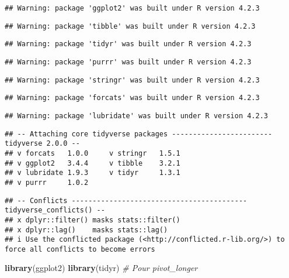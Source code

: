 \documentclass[
]{article}
\newenvironment{Shaded}{\begin{snugshade}}{\end{snugshade}}
\newcommand{\CommentTok}[1]{\textcolor[rgb]{0.56,0.35,0.01}{\textit{#1}}}
\newcommand{\FunctionTok}[1]{\textcolor[rgb]{0.13,0.29,0.53}{\textbf{#1}}}
\newcommand{\NormalTok}[1]{#1}
\begin{document}
\begin{verbatim}
## Warning: package 'ggplot2' was built under R version 4.2.3
\end{verbatim}

\begin{verbatim}
## Warning: package 'tibble' was built under R version 4.2.3
\end{verbatim}

\begin{verbatim}
## Warning: package 'tidyr' was built under R version 4.2.3
\end{verbatim}

\begin{verbatim}
## Warning: package 'purrr' was built under R version 4.2.3
\end{verbatim}

\begin{verbatim}
## Warning: package 'stringr' was built under R version 4.2.3
\end{verbatim}

\begin{verbatim}
## Warning: package 'forcats' was built under R version 4.2.3
\end{verbatim}

\begin{verbatim}
## Warning: package 'lubridate' was built under R version 4.2.3
\end{verbatim}

\begin{verbatim}
## -- Attaching core tidyverse packages ------------------------ tidyverse 2.0.0 --
## v forcats   1.0.0     v stringr   1.5.1
## v ggplot2   3.4.4     v tibble    3.2.1
## v lubridate 1.9.3     v tidyr     1.3.1
## v purrr     1.0.2
\end{verbatim}

\begin{verbatim}
## -- Conflicts ------------------------------------------ tidyverse_conflicts() --
## x dplyr::filter() masks stats::filter()
## x dplyr::lag()    masks stats::lag()
## i Use the conflicted package (<http://conflicted.r-lib.org/>) to force all conflicts to become errors
\end{verbatim}

\begin{Shaded}
\begin{Highlighting}[]
\FunctionTok{library}\NormalTok{(ggplot2)}
\FunctionTok{library}\NormalTok{(tidyr) }\CommentTok{\# Pour pivot\_longer}
\end{Highlighting}
\end{Shaded}
\end{document}
